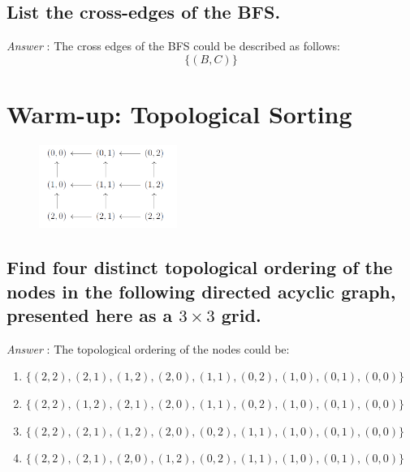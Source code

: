 \documentclass[11pt]{article}
\begin{document}
\subsection{List the cross-edges of the BFS.}
\noindent \emph{Answer} : The cross edges of the BFS could be described as follows:
\begin{equation*}
	\{(B,C)\}
\end{equation*}


\section{Warm-up: Topological Sorting}
\begin{figure}[h]
	\centering
	\includegraphics[width=0.4\textwidth]{Figure/2.png}
	\label{fig:fig4}
\end{figure}
\subsection{Find four distinct topological ordering of the nodes in the following directed acyclic graph, presented here as a $3\times3$ grid.}
\noindent\emph{Answer} : The topological ordering of the nodes could be:
\begin{enumerate}
	\item $\{(2,2),(2,1),(1,2),(2,0),(1,1),(0,2),(1,0),(0,1),(0,0)\}$
	\item $\{(2,2),(1,2),(2,1),(2,0),(1,1),(0,2),(1,0),(0,1),(0,0)\}$
	\item $\{(2,2),(2,1),(1,2),(2,0),(0,2),(1,1),(1,0),(0,1),(0,0)\}$
	\item $\{(2,2),(2,1),(2,0),(1,2),(0,2),(1,1),(1,0),(0,1),(0,0)\}$
\end{enumerate}
\end{document}
